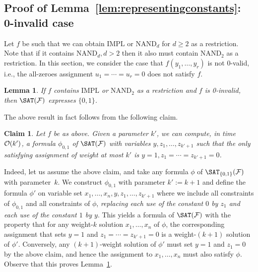 \documentclass[10pt,a4paper]{article}
\theoremstyle{plain}
\newtheorem{lem}[thm]{Lemma}
\newtheorem{claim}[thm]{Claim}
\newcommand{\Oh}{{\cal O}}
\newcommand{\NAND}{\mathrm{NAND}}
\newcommand{\Impl}{\mathrm{IMPL}}
\newcommand{\confam}{\mathcal{F}}
\begin{document}
\subsection{Proof of Lemma~\ref{lem:representingconstants}: 0-invalid case}
\label{sec:0invalid}
%
%
Let $f$ be such that we can obtain $\Impl$ or $\NAND_d$ for $d\ge 2$ as a restriction. Note that if it contains $\NAND_{d},d>2$ then it also must contain $\NAND_2$ as a restriction. 
%
In this section, we consider the case that $f(y_1,\dots,y_r)$ is not $0$-valid, i.e., the all-zeroes assignment $u_1=\cdots = u_r= 0$ does not satisfy $f$.
%
\begin{lem}\label{lem:0invalidexpressesboth}
If $f$ contains $\Impl$ or $\NAND_2$ as a restriction and $f$ is 0-invalid, then $\SAT(\confam)$ expresses $\{0,1\}$.
\end{lem}
%
The above result in fact follows from the following claim.
%
\begin{claim}\label{claim:0invalidconst}
Let $f$ be as above. Given a parameter $k'$, we can compute, in time $\Oh(k')$, a formula $\phi_{0,1}$ of $\SAT(\confam)$ with variables $y, z_1, \dots, z_{k'+1}$ such that the only satisfying assignment of weight at most $k'$ is $y=1, z_1=\cdots = z_{k'+1} = 0$.
\end{claim}
%
Indeed, let us assume the above claim, and take any formula $\phi$ of $\SAT_{\{0,1\}}(\confam)$ with parameter~$k$. We construct $\phi_{0,1}$ with parameter $k':=k+1$ and define the formula $\phi'$ on variable set $x_1,\dots,x_n, y, z_1,\dots, z_{k'+1}$ where we include all constraints of $\phi_{0,1}$ and all constraints of $\phi$, \emph{replacing each use of the constant $0$ by $z_1$ and each use of the constant $1$ by $y$}. This yields a formula of $\SAT(\confam)$ with the property that for any weight-$k$ solution $x_1,\dots,x_n$ of $\phi$, the corresponding assignment that sets $y=1$ and $z_1=\cdots=z_{k'+1} = 0$ is a weight-$(k+1)$ solution of $\phi'$. Conversely, any $(k+1)$-weight solution of $\phi'$ must set $y=1$ and $z_1=0$ by the above claim, and hence the assignment to $x_1,\dots,x_n$ must also satisfy $\phi$. Observe that this proves Lemma~\ref{lem:0invalidexpressesboth}. 
%
\end{document}
